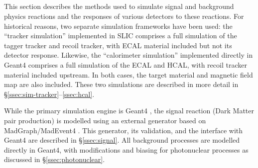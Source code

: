 
\subsection*{}
This section describes the methods used to simulate signal and background physics reactions and the responses of various detectors to these reactions.  
For historical reasons, two separate simulation frameworks have been used: the ``tracker simulation'' implemented in SLIC comprises a full simulation of the tagger tracker and recoil tracker, with ECAL material included but not its detector response.  Likewise, the ``calorimeter simulation'' implemented directly in Geant4 comprises a full simulation of the ECAL and HCAL, with recoil tracker material included upstream. In both cases, the target material and magnetic field map are also included.  These two simulations are described in more detail in \S\ref{ssec:sim-tracker}--\ref{ssec:hcal}.

While the primary simulation engine is Geant4 \cite{g4}, the signal reaction (Dark Matter pair production) is modelled using an external generator based on MadGraph/MadEvent4 \cite{MG4}.  This generator, its validation, and the interface with Geant4 are described in \S\ref{ssec:signal}.  All background processes are modelled directly in Geant4, with modifications and biasing for photonuclear processes as discussed in \S\ref{ssec:photonuclear}.